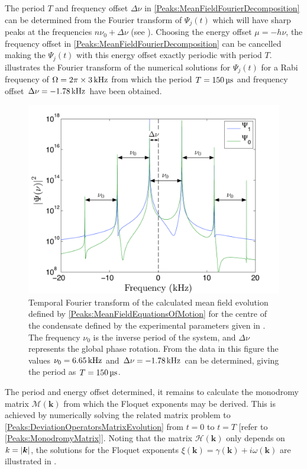 The period $T$ and frequency offset $\Delta\nu$ in \eqref{Peaks:MeanFieldFourierDecomposition} can be determined from the Fourier transform of $\Psi_j(t)$ which will have sharp peaks at the frequencies $n \nu_0 + \Delta \nu$ (see ). Choosing the energy offset $\mu=-h \nu$, the frequency offset in \eqref{Peaks:MeanFieldFourierDecomposition} can be cancelled making the $\Psi_j(t)$ with this energy offset exactly periodic with period $T$.  illustrates the Fourier transform of the numerical solutions for $\Psi_j(t)$ for a Rabi frequency of $\Omega = 2 \pi \times \unit[3]{kHz}$ from which the period $T=\unit[150]{\micro{}s}$ and frequency offset $\Delta \nu = \unit[-1.78]{kHz}$ have been obtained.

\begin{figure}
    \centering
    \includegraphics[width=14cm]{MeanFieldFourierTransform}
    \caption{\label{Peaks:MeanFieldFourierTransform} Temporal Fourier transform of the calculated mean field evolution defined by \eqref{Peaks:MeanFieldEquationsOfMotion} for the centre of the condensate defined by the experimental parameters given in . The frequency $\nu_0$ is the inverse period of the system, and $\Delta\nu$ represents the global phase rotation. From the data in this figure the values $\nu_0 = \unit[6.65]{kHz}$ and $\Delta\nu = \unit[-1.78]{kHz}$ can be determined, giving the period as $T=\unit[150]{\micro{}s}$.}
\end{figure}

The period and energy offset determined, it remains to calculate the mono\-dromy matrix $\mathcal{M}(\bm{k})$ from which the Floquet exponents may be derived. This is achieved by numerically solving the related matrix problem to \eqref{Peaks:DeviationOperatorsMatrixEvolution} from $t=0$ to $t=T$ [refer to \eqref{Peaks:MonodromyMatrix}]. Noting that the matrix $\mathcal{H}(\bm{k})$ only depends on $k = \left|\bm{k}\right|$, the solutions for the Floquet exponents $\xi(\bm{k}) = \gamma(\bm{k}) + i\omega(\bm{k})$ are illustrated in .

